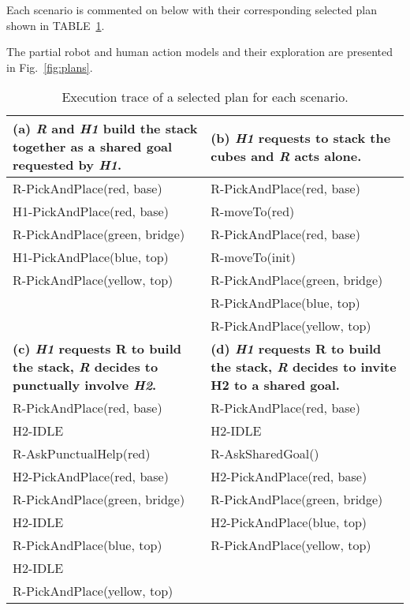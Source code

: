 Each scenario is commented on below with their corresponding selected plan shown in TABLE~\ref{tab:plans}.

The partial robot and human action models and their exploration are presented in Fig.~\ref{fig:plans}.

\begin{table}
\small
\begin{tabularx}{0.98\textwidth}{|X||X|}
    \hline
    \textbf{(a) \textit{R} and \textit{H1} build the stack together as a shared goal requested by \textit{H1}.}     & \textbf{(b) \textit{H1} requests to stack the cubes and \textit{R} acts alone.} \\
    \hline
    R-PickAndPlace(red, base)     & R-PickAndPlace(red, base) \\ 
    H1-PickAndPlace(red, base)     & R-moveTo(red) \\  
    R-PickAndPlace(green, bridge) & R-PickAndPlace(red, base) \\
    H1-PickAndPlace(blue, top)     & R-moveTo(init) \\
    R-PickAndPlace(yellow, top)   & R-PickAndPlace(green, bridge) \\
                                    & R-PickAndPlace(blue, top) \\
                                    & R-PickAndPlace(yellow, top) \\
    \hline \hline
    \textbf{(c) \textit{H1} requests R to build the stack, \textit{R} decides to punctually involve \textit{H2}.} & \textbf{(d) \textit{H1} requests R to build the stack, \textit{R} decides to invite H2 to a shared goal.} \\
    \hline
    R-PickAndPlace(red, base)     & R-PickAndPlace(red, base) \\
    H2-IDLE                        & H2-IDLE \\
    R-AskPunctualHelp(red)        & R-AskSharedGoal() \\
    H2-PickAndPlace(red, base)     & H2-PickAndPlace(red, base) \\
    R-PickAndPlace(green, bridge) & R-PickAndPlace(green, bridge) \\
    H2-IDLE                        & H2-PickAndPlace(blue, top) \\
    R-PickAndPlace(blue, top)     & R-PickAndPlace(yellow, top) \\
    H2-IDLE                        & \\
    R-PickAndPlace(yellow, top)   & \\
    \hline
\end{tabularx}
\caption{Execution trace of a selected plan for each scenario.}
\label{tab:plans}
\end{table}

